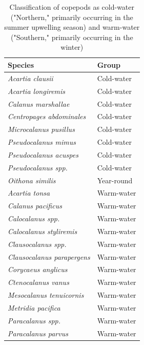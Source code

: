 \documentclass[12pt,twoside]{reedthesis}
\begin{document}
\begin{table}[htbp] 
	
	\caption[Seasonal classification of copepods]{Classification of copepods as cold-water ("Northern," primarily occurring in the summer upwelling season) and warm-water ("Southern," primarily occurring in the winter) \autocite{NOAAFisheries2024, Peterson2003, Peterson1977}}  %
	
	\begin{center} 
		\begin{tabular}{l l}  
			\toprule
			Species &  Group \\ 
			\midrule 
			\textit{Acartia clausii} 				& 	Cold-water 	 \\ 
			\textit{Acartia longiremis}	& Cold-water  \\
			\textit{Calanus marshallae}	& Cold-water  \\
			\textit{Centropages abdominales}	& Cold-water  \\
			\textit{Microcalanus pusillus}	& Cold-water  \\
			\textit{Pseudocalanus mimus} & Cold-water  \\
			\textit{Pseudocalanus acuspes} & Cold-water  \\
			\textit{Pseudocalanus spp.}	& Cold-water  \\
			\textit{Oithona similis}	& Year-round  \\
			\textit{Acartia tonsa}	& Warm-water  \\
			\textit{Calanus pacificus}	& Warm-water  \\
			\textit{Calocalanus spp.}	& Warm-water  \\
			\textit{Calocalanus styliremis}	& Warm-water  \\
			\textit{Clausocalanus spp.}	& Warm-water  \\
			\textit{Clausocalanus parapergens} & Warm-water  \\
			\textit{Corycaeus anglicus}	& Warm-water  \\
			\textit{Ctenocalanus vanus}	& Warm-water  \\
			\textit{Mesocalanus tenuicornis}	& Warm-water  \\
			\textit{Metridia pacifica}	& Warm-water  \\
			\textit{Paracalanus spp.}	& Warm-water  \\
			\textit{Paracalanus parvus}	& Warm-water  \\
			\bottomrule 
		\end{tabular}
		\label{CopepodGroups} %
	\end{center}
\end{table}
\end{document}
